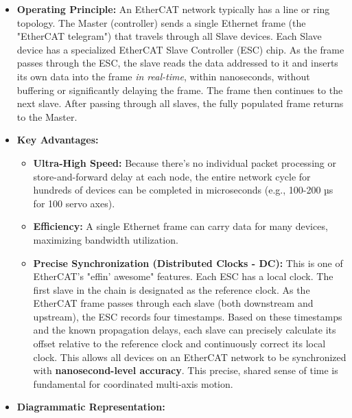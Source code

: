 \begin{itemize}
    \item \textbf{Operating Principle:}
    An EtherCAT network typically has a line or ring topology. The Master (controller) sends a single Ethernet frame (the "EtherCAT telegram") that travels through all Slave devices. Each Slave device has a specialized EtherCAT Slave Controller (ESC) chip. As the frame passes through the ESC, the slave reads the data addressed to it and inserts its own data into the frame \textit{in real-time}, within nanoseconds, without buffering or significantly delaying the frame. The frame then continues to the next slave. After passing through all slaves, the fully populated frame returns to the Master.
    \item \textbf{Key Advantages:}
        \begin{itemize}
            \item \textbf{Ultra-High Speed:} Because there's no individual packet processing or store-and-forward delay at each node, the entire network cycle for hundreds of devices can be completed in microseconds (e.g., 100-200 µs for 100 servo axes).
            \item \textbf{Efficiency:} A single Ethernet frame can carry data for many devices, maximizing bandwidth utilization.
            \item \textbf{Precise Synchronization (Distributed Clocks - DC):} This is one of EtherCAT's "effin' awesome" features. Each ESC has a local clock. The first slave in the chain is designated as the reference clock. As the EtherCAT frame passes through each slave (both downstream and upstream), the ESC records four timestamps. Based on these timestamps and the known propagation delays, each slave can precisely calculate its offset relative to the reference clock and continuously correct its local clock. This allows all devices on an EtherCAT network to be synchronized with \textbf{nanosecond-level accuracy}. This precise, shared sense of time is fundamental for coordinated multi-axis motion.
        \end{itemize}
    \item \textbf{Diagrammatic Representation:}
    

\end{itemize}
